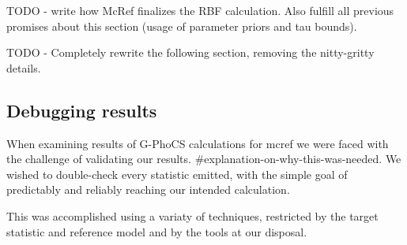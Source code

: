 \documentclass[11pt]{article}
\newcommand{\1}{\mathbbm{1}}
\newcommand{\gp}{G-PhoCS }
\begin{document}
TODO - write how McRef finalizes the RBF calculation. Also fulfill all previous promises about this section (usage of parameter priors and tau bounds).

TODO - Completely rewrite the following section, removing the nitty-gritty details.

\subsection{Debugging results}

When examining results of \gp calculations for mcref we were faced with the challenge of validating our results. \#explanation-on-why-this-was-needed. We wished to double-check every statistic emitted, with the simple goal of predictably and reliably reaching our intended calculation.

This was accomplished using a variaty of techniques, restricted by the target statistic and reference model and by the tools at our disposal. 
\end{document}
